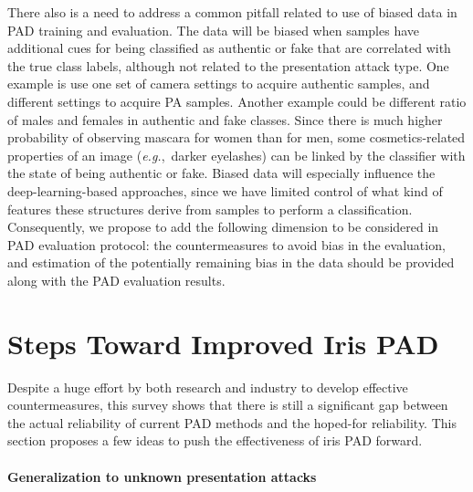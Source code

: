 \documentclass[format=acmsmall, review=false, timestamp=false]{acmart}
\newcommand{\eg}{{\it e.g.},~}
\begin{document}
There also is a need to address a common pitfall related to use of biased data in PAD training and evaluation. The data will be biased when samples have additional cues for being classified as {authentic} or {fake} that are correlated with the true class labels, {although} not related to the presentation attack type. One example is use one {set of} camera settings to acquire authentic samples, and different settings to acquire PA samples. Another example could be different ratio of males and females in {authentic} and {fake} classes. Since there is much higher probability of observing mascara for women than for men, some cosmetics-related properties of an image (\eg darker eyelashes) can be linked by the classifier with the state of being authentic {or} {fake}. Biased data will especially influence the {deep-learning-based} approaches, since we have limited control of what kind of features these structures derive from samples to perform a classification. Consequently, we propose to add the following dimension to be considered in PAD evaluation protocol: the countermeasures to avoid bias in the evaluation, and estimation of the potentially remaining bias in the data should be provided along with the PAD evaluation results.



\section{Steps Toward Improved Iris PAD}
\label{sec:Conclusions}

Despite a huge effort by both research and industry to develop effective countermeasures, this survey shows that there is still a significant gap between the actual reliability of current PAD methods and the hoped-for reliability. This section proposes a few ideas to push the effectiveness of iris PAD forward.

\paragraph{Generalization to unknown presentation attacks}
\end{document}
